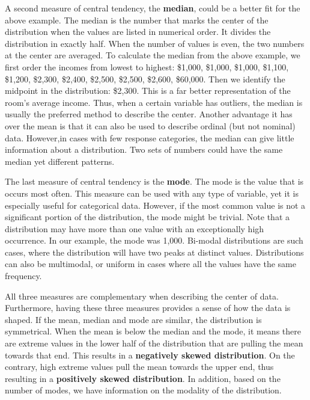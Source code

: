 \documentclass{book}
\begin{document}
A second measure of central tendency, the \textbf{median}, could be a better
fit for the above example. The median is the number that marks the center of
the distribution when the values are listed in numerical order. It divides the
distribution in exactly half. When the number of values is even, the two
numbers at the center are averaged. To calculate the median from the above
example, we first order the incomes from lowest to highest: \$1,000, \$1,000,
\$1,000, \$1,100, \$1,200, \$2,300, \$2,400, \$2,500, \$2,500, \$2,600,
\$60,000. Then we identify the midpoint in the distribution: \$2,300. This is
a far better representation of the room's average income. Thus, when a certain
variable has outliers, the median is usually the preferred method to describe
the center. Another advantage it has over the mean is that it can also be used
to describe ordinal (but not nominal) data. However,in cases with few response
categories, the median can give little information about a distribution. Two
sets of numbers could have the same median yet different patterns.

The last measure of central tendency is the \textbf{mode}. The mode is the
value that is occurs most often. This measure can be used with any type of
variable, yet it is especially useful for categorical data. However, if the
most common value is not a significant portion of the distribution, the mode
might be trivial. Note that a distribution may have more than one value with
an exceptionally high occurrence. In our example, the mode was 1,000. Bi-modal
distributions are such cases, where the distribution will have two peaks at
distinct values. Distributions can also be multimodal, or uniform in cases
where all the values have the same frequency.

All three measures are complementary when describing the center of data.
Furthermore, having these three measures provides a sense of how the data is
shaped. If the mean, median and mode are similar, the distribution is
symmetrical. When the mean is below the median and the mode, it means there
are extreme values in the lower half of the distribution that are pulling the
mean towards that end. This results in a \textbf{negatively skewed
distribution}. On the contrary, high extreme values pull the mean towards the
upper end, thus resulting in a \textbf{positively skewed distribution}. In
addition, based on the number of modes, we have information on the modality of
the distribution.
\end{document}
